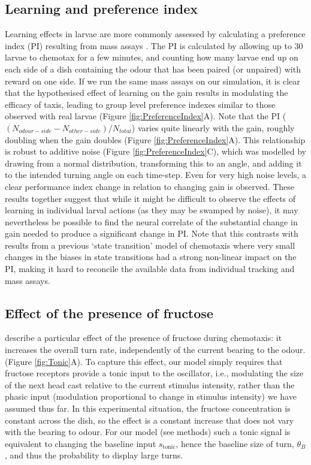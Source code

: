 \documentclass[11pt,a4paper]{article}
\begin{document}
\subsection{Learning and preference index}
Learning effects in larvae are more commonly assessed by calculating a preference index (PI) resulting from mass assays \citep{gerber2009smelling}. The PI is calculated by allowing up to 30 larvae to chemotax for a few minutes, and counting how many larvae end up on each side of a dish containing the odour that has been paired (or unpaired) with reward on one side. If we run the same mass assays on our simulation, it is clear that the hypothesised effect of learning on the gain results in modulating the efficacy of taxis, leading to group level preference indexes similar to those observed with real larvae (Figure \ref{fig:PreferenceIndex}A). Note that the PI ($(N_{odour-side}-N_{other-side})/N_{total}$)
varies quite linearly with the gain, roughly doubling when the gain doubles (Figure \ref{fig:PreferenceIndex}A).
 This relationship is robust to additive noise (Figure \ref{fig:PreferenceIndex}C), which was modelled by drawing from a normal distribution, transforming this to an angle, and adding it to the intended turning angle on each time-step.
  Even for very high noise levels, a clear performance index change in relation to changing gain is observed. These results together suggest that while it might be difficult to observe the effects of learning in individual larval actions (as they may be swamped by noise), it may nevertheless be possible to find the neural correlate of the substantial change in gain needed to produce a significant change in PI.
Note that this contrasts with results from a previous `state transition' model of chemotaxis \citep{davies2015model} where very small changes in the biases in state transitions had a strong non-linear impact on the PI, making it hard to reconcile the available data from individual tracking and mass assays.

\subsection{Effect of the presence of fructose}
\cite{schleyer2015learning} describe a particular effect of the presence of fructose during chemotaxis: it increases the overall turn rate, independently of the current bearing to the odour. (Figure \ref{fig:Tonic}A). To capture this effect, our model simply requires that fructose receptors provide a tonic input to the oscillator, i.e., modulating the size of the next head cast relative to the current stimulus intensity, rather than the phasic input (modulation proportional to change in stimulus intensity) we have assumed thus far. In this experimental situation, the fructose concentration is constant across the dish, so the effect is a constant increase that does not vary with the bearing to odour. For our model (see methods) such a tonic signal is equivalent to changing the baseline input $s_{\text{tonic}}$, hence the baseline size of turn, $\theta_B$, and thus the probability to display large turns. 
\end{document}
